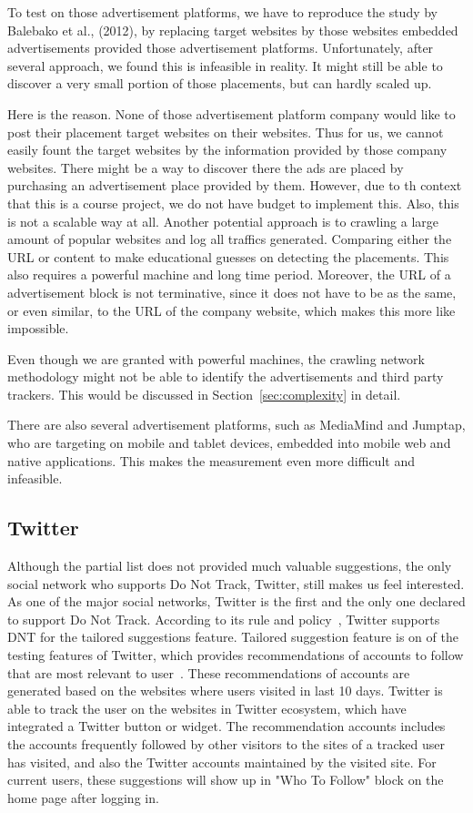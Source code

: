 \documentclass{sig-alternate}
\begin{document}
To test on those advertisement platforms, we have to reproduce the study by Balebako et al., (2012), by replacing target websites by those websites embedded advertisements provided those advertisement platforms. Unfortunately, after several approach, we found this is infeasible in reality. It might still be able to discover a very small portion of those placements, but can hardly scaled up.

Here is the reason. None of those advertisement platform company would like to post their placement target websites on their websites. Thus for us, we cannot easily fount the target websites by the information provided by those company websites. There might be a way to discover there the ads are placed by purchasing an advertisement place provided by them. However, due to th context that this is a course project, we do not have budget to implement this. Also, this is not a scalable way at all. Another potential approach is to crawling a large amount of popular websites and log all traffics generated. Comparing either the URL or content to make educational guesses on detecting the placements. This also requires a powerful machine and long time period. Moreover, the URL of a advertisement block is not terminative, since it does not have to be as the same, or even similar, to the URL of the company website, which makes this more like impossible.

Even though we are granted with powerful machines, the crawling network methodology might not be able to identify the advertisements and third party trackers. This would be discussed in Section~\ref{sec:complexity} in detail.

There are also several advertisement platforms, such as MediaMind and Jumptap, who are targeting on mobile and tablet devices, embedded into mobile web and native applications. This makes the measurement even more difficult and infeasible.

\subsection{Twitter}

Although the partial list does not provided much valuable suggestions, the only social network who supports Do Not Track, Twitter, still makes us feel interested. As one of the major social networks, Twitter is the first and the only one declared to support Do Not Track. According to its rule and policy~\cite{twitterdnt}, Twitter supports DNT for the tailored suggestions feature. Tailored suggestion feature is on of the testing features of Twitter, which provides recommendations of accounts to follow that are most relevant to user~\cite{twitterfaq}. These recommendations of accounts are generated based on the websites where users visited in last 10 days. Twitter is able to track the user on the websites in Twitter ecosystem, which have integrated a Twitter button or widget. The recommendation accounts includes the accounts frequently followed by other visitors to the sites of a tracked user has visited, and also the Twitter accounts maintained by the visited site. For current users, these suggestions will show up in "Who To Follow" block on the home page after logging in.
\end{document}
